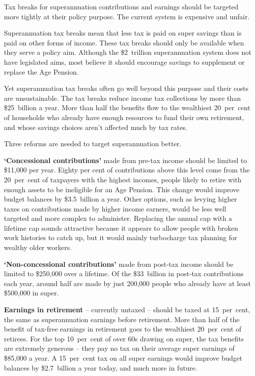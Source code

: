 

\setlength{\overviewextra}{2pt}
\addtolength{\columnsep}{\overviewextra}
\begin{overview}[-25pt]
\label{overview:SUPER}
Tax breaks for superannuation contributions and earnings should be targeted more tightly at their policy purpose. The current system is expensive and unfair. 

Superannuation tax breaks mean that less tax is paid on super savings than is paid on other forms of income. These tax breaks should only be available when they serve a policy aim. Although the \$2~trillion superannuation system does not have legislated aims, most believe it should encourage savings to supplement or replace the Age Pension. 

Yet superannuation tax breaks often go well beyond this purpose and their costs are unsustainable. The tax breaks reduce income tax collections by more than \$25~billion a year. More than half the benefits flow to the wealthiest 20~per~cent of households who already have enough resources to fund their own retirement, and whose savings choices aren’t affected much by tax rates. 

Three reforms are needed to target superannuation better.

\textbf{‘Concessional contributions’} made from pre-tax income should be limited to \$11,000 per year. Eighty per cent of contributions above this level come from the 20~per~cent of taxpayers with the highest incomes, people likely to retire with enough assets to be ineligible for an Age Pension. This change would improve budget balances by \$3.5~billion a year. Other options, such as levying higher taxes on contributions made by higher income earners, would be less well targeted and more complex to administer. Replacing the annual cap with a lifetime cap sounds attractive because it appears to allow people with broken work histories to catch up, but it would mainly turbocharge tax planning for wealthy older workers.

\textbf{‘Non-concessional contributions’} made from post-tax income
should  be limited to \$250,000 over a lifetime. Of the \$33~billion in
post-tax contributions each year, around half are made by just
200,000 people who already have at least \$500,000 in super.


\textbf{Earnings in retirement} – currently untaxed – should be taxed at 15~per~cent, the same as superannuation earnings before retirement. More than half of the benefit of tax-free earnings in retirement goes to the wealthiest 20~per~cent of retirees. For the top 10~per~cent of over 60s drawing on super, the tax benefits are extremely generous – they pay no tax on their average super earnings of \$85,000 a year. A 15~per~cent tax on all super earnings would improve budget balances by {\$2.7~billion} a year today, and much more in future. 


\end{overview}
